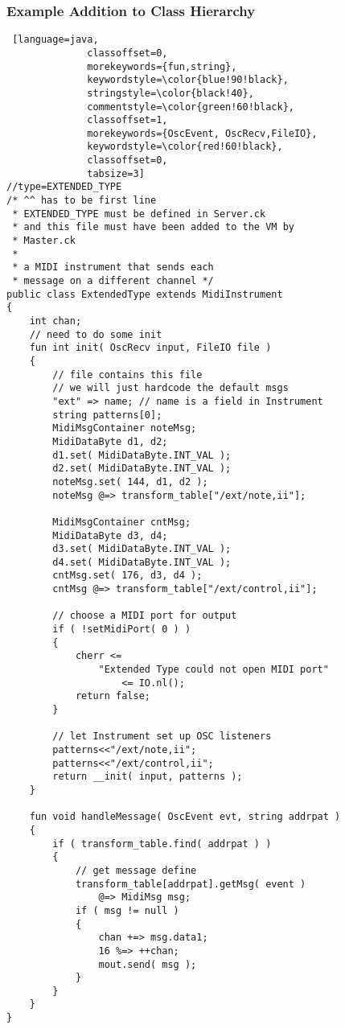 \documentclass[12pt]{article}
\begin{document}
\subsubsection{Example Addition to Class Hierarchy}
\begin{lstlisting} [language=java,
			  classoffset=0,
			  morekeywords={fun,string},
			  keywordstyle=\color{blue!90!black},
			  stringstyle=\color{black!40},
			  commentstyle=\color{green!60!black},
			  classoffset=1,
			  morekeywords={OscEvent, OscRecv,FileIO},
			  keywordstyle=\color{red!60!black},
			  classoffset=0,
			  tabsize=3]
//type=EXTENDED_TYPE
/* ^^ has to be first line
 * EXTENDED_TYPE must be defined in Server.ck
 * and this file must have been added to the VM by
 * Master.ck 
 *
 * a MIDI instrument that sends each 
 * message on a different channel */
public class ExtendedType extends MidiInstrument
{
	int chan;
	// need to do some init
	fun int init( OscRecv input, FileIO file )
	{
		// file contains this file
		// we will just hardcode the default msgs
		"ext" => name; // name is a field in Instrument
		string patterns[0];
		MidiMsgContainer noteMsg;
		MidiDataByte d1, d2;
		d1.set( MidiDataByte.INT_VAL );
		d2.set( MidiDataByte.INT_VAL );
		noteMsg.set( 144, d1, d2 );
		noteMsg @=> transform_table["/ext/note,ii"];
		
		MidiMsgContainer cntMsg;
		MidiDataByte d3, d4;
		d3.set( MidiDataByte.INT_VAL );
		d4.set( MidiDataByte.INT_VAL );
		cntMsg.set( 176, d3, d4 );
		cntMsg @=> transform_table["/ext/control,ii"];
		
		// choose a MIDI port for output
		if ( !setMidiPort( 0 ) )
		{
			cherr <= 
				"Extended Type could not open MIDI port" 
					<= IO.nl();
			return false;
		}
		
		// let Instrument set up OSC listeners
		patterns<<"/ext/note,ii";
		patterns<<"/ext/control,ii";
		return __init( input, patterns );
	}
	
	fun void handleMessage( OscEvent evt, string addrpat )
	{
		if ( transform_table.find( addrpat ) )
		{
			// get message define
			transform_table[addrpat].getMsg( event ) 
				@=> MidiMsg msg;
			if ( msg != null )
			{
				chan +=> msg.data1;
				16 %=> ++chan;
				mout.send( msg );
			}
		}
	}
}

  
\end{lstlisting}
\end{document}
